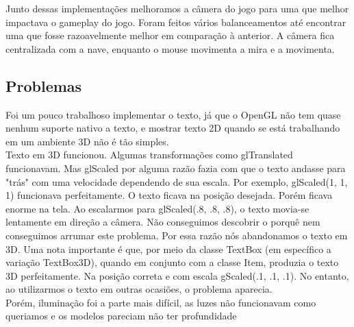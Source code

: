 \documentclass[12pt,a4paper]{article}
\begin{document}
        Junto dessas implementações melhoramos a câmera do jogo para uma que melhor impactava o gameplay do jogo. Foram feitos
    vários balanceamentos até encontrar uma que fosse razoavelmente melhor em comparação à anterior. A câmera fica 
    centralizada com a nave, enquanto o mouse movimenta a mira e a movimenta.\\
    
    \subsection{Problemas}
      Foi um pouco trabalhoso implementar o texto, já que o OpenGL não tem quase nenhum suporte nativo a texto, e mostrar texto 2D quando se está trabalhando em um ambiente 3D não é tão simples.\\
      
      Texto em 3D funcionou. Algumas transformações como glTranslated funcionavam. Mas glScaled por alguma razão fazia com que o texto andasse para "trás" com uma velocidade dependendo de sua escala. Por exemplo, glScaled(1, 1, 1) funcionava perfeitamente. O texto ficava na posição desejada. Porém ficava enorme na tela. Ao escalarmos para glScaled(.8, .8, .8), o texto movia-se lentamente em direção a câmera. Não conseguimos descobrir o porquê nem conseguimos arrumar este problema. Por essa razão nós abandonamos o texto em 3D. Uma nota importante é que, por meio da classe TextBox (em específico a variação TextBox3D), quando em conjunto com a classe Item, produzia o texto 3D perfeitamente. Na posição correta e com escala gScaled(.1, .1, .1). No entanto, ao utilizarmos o texto em outras ocasiões, o problema aparecia.\\

      Porém, iluminação foi a parte mais difícil, as luzes não funcionavam como queriamos e os modelos pareciam não ter profundidade 
		
\end{document}
